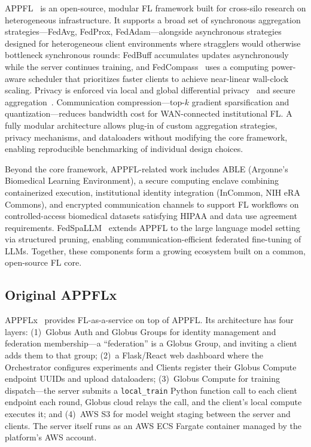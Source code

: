 \documentclass[conference]{IEEEtran}
\begin{document}
APPFL~\cite{ryu2022appfl, li2025advances} is an open-source, modular
FL framework built for cross-silo research on heterogeneous
infrastructure. It supports a broad set of synchronous aggregation
strategies---FedAvg, FedProx, FedAdam---alongside asynchronous
strategies designed for heterogeneous client environments where
stragglers would otherwise bottleneck synchronous rounds: FedBuff
accumulates updates asynchronously while the server continues training,
and FedCompass~\cite{li2024fedcompass} uses a computing power-aware
scheduler that prioritizes faster clients to achieve near-linear
wall-clock scaling. Privacy is enforced via local and global
differential privacy~\cite{dwork2014} and secure
aggregation~\cite{bonawitz2017}. Communication compression---top-$k$
gradient sparsification and quantization---reduces bandwidth cost for
WAN-connected institutional FL. A fully modular architecture allows
plug-in of custom aggregation strategies, privacy mechanisms, and
dataloaders without modifying the core framework, enabling
reproducible benchmarking of individual design choices.

Beyond the core framework, APPFL-related work includes ABLE (Argonne's
Biomedical Learning Environment), a secure computing enclave combining
containerized execution, institutional identity integration (InCommon,
NIH eRA Commons), and encrypted communication channels to support FL
workflows on controlled-access biomedical datasets satisfying HIPAA and
data use agreement requirements. FedSpaLLM~\cite{bai2025fedspalllm}
extends APPFL to the large language model setting via structured
pruning, enabling communication-efficient federated fine-tuning of
LLMs. Together, these components form a growing ecosystem built on a
common, open-source FL core.

\subsection{Original APPFLx}

APPFLx~\cite{li2023appflx, hoang2025appflx} provides FL-as-a-service
on top of APPFL. Its architecture has four layers: (1)~Globus Auth and
Globus Groups for identity management and federation membership---a
``federation'' is a Globus Group, and inviting a client adds them to
that group; (2)~a Flask/React web dashboard where the Orchestrator
configures experiments and Clients register their Globus Compute
endpoint UUIDs and upload dataloaders; (3)~Globus Compute for training
dispatch---the server submits a \texttt{local\_train} Python function
call to each client endpoint each round, Globus cloud relays the call,
and the client's local compute executes it; and (4)~AWS S3 for model
weight staging between the server and clients. The server itself runs
as an AWS ECS Fargate container managed by the platform's AWS account.
\end{document}
